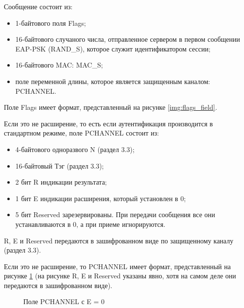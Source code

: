 Сообщение состоит из:

\begin{itemize}
\item 1-байтового поля Flags;
\item 16-байтового случаного числа, отправленное сервером в первом сообщении EAP-PSK (RAND\_S), которое служит идентификатором сессии;
\item 16-байтового MAC: MAC\_S;
\item поле переменной длины, которое является защищенным каналом: PCHANNEL.
\end{itemize}

Поле Flags имеет формат, представленный на рисунке \ref{img:flags_field}.

Если это не расширение, то есть если аутентификация производится в стандартном режиме, поле PCHANNEL состоит из:

\begin{itemize}
\item 4-байтового одноразвого N (раздел 3.3);
\item 16-байтовый Тэг (раздел 3.3);
\item 2 бит R индикации результата;
\item 1 бит E индикации расширения, который установлен в 0;
\item 5 бит Reserved зарезервированы. При передачи сообщения все они устанавливаются в 0, а при приеме игнорируются.
\end{itemize}

R, E и Reserved передаются в зашифрованном виде по защищенному каналу (раздел 3.3).

Если это не расширение, то PCHANNEL имеет формат, представленный на рисунке \ref{img:simple_pchannel} (на рисунке R, E и Reserved указаны явно, хотя на самом деле они передаются в зашифрованном виде).

\begin{figure}[h!]
\caption{Поле PCHANNEL с E = 0}
\label{img:simple_pchannel}
\end{figure}
